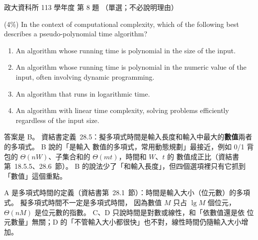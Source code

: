 \begin{pastexam}[label={px:nccu-113-dsa-08}]{政大資科所 113 學年度 第 8 題}
（單選；不必說明理由）

(4\%) In the context of computational complexity, which of the following best describes a
pseudo-polynomial time algorithm?
\begin{enumerate}[label=\Alph*.]
\item An algorithm whose running time is polynomial in the size of the input.
\item An algorithm whose running time is polynomial in the numeric value of the input, often involving
dynamic programming.
\item An algorithm that runs in logarithmic time.
\item An algorithm with linear time complexity, solving problems efficiently regardless of the input size.
\end{enumerate}
\end{pastexam}

\begin{pastsoln}
答案是 B。 資結書定義~28.5：擬多項式時間是輸入長度和輸入中最大的\textbf{數值}兩者的多項式。 B 說的「是輸入
數值的多項式，常用動態規劃」最接近，例如 0/1 背包的 $\Theta(nW)$、子集合和的 $\Theta(mt)$，時間和 $W$、$t$ 的
數值成正比（資結書第~18.5.5、28.6~節）。 B 的說法少了「和輸入長度」，但四個選項裡只有它抓到「數值」這個重點。

A 是多項式時間的定義（資結書第~28.1~節）：時間是輸入大小（位元數）的多項式。 擬多項式時間不一定是多項式時間，
因為數值 $M$ 只占 $\lg M$ 個位元，$\Theta(nM)$ 是位元數的指數。 C、D 只說時間是對數或線性，和「依數值還是依
位元數量」無關；D 的「不管輸入大小都很快」也不對，線性時間仍隨輸入大小增加。
\end{pastsoln}
